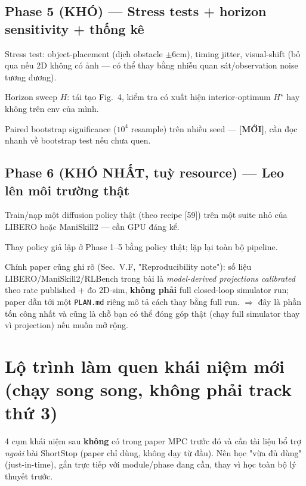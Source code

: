 \documentclass[a4paper,12pt]{article}
\let\stdsection\section
\renewcommand{\section}{\clearpage\stdsection}
\newcommand{\new}{\textcolor{red!60!black}{\textbf{[MỚI]}}}
\begin{document}
\subsection{Phase 5 (KHÓ) --- Stress tests + horizon sensitivity + thống kê}
\begin{tasklist}
  \item[\square] Stress test: object-placement (dịch obstacle $\pm6$cm), timing jitter, visual-shift (bỏ qua nếu 2D không có ảnh — có thể thay bằng nhiễu quan sát/observation noise tương đương).
  \item[\square] Horizon sweep $H$: tái tạo Fig.~4, kiểm tra có xuất hiện interior-optimum $H^\star$ hay không trên env của mình.
  \item[\square] Paired bootstrap significance ($10^4$ resample) trên nhiều seed — \new, cần đọc nhanh về bootstrap test nếu chưa quen.
\end{tasklist}

\subsection{Phase 6 (KHÓ NHẤT, tuỳ resource) --- Leo lên môi trường thật}
\begin{tasklist}
  \item[\square] Train/nạp một diffusion policy thật (theo recipe [59]) trên một suite nhỏ của LIBERO hoặc ManiSkill2 — cần GPU đáng kể.
  \item[\square] Thay policy giả lập ở Phase 1--5 bằng policy thật; lặp lại toàn bộ pipeline.
  \item[\textbf{Lưu ý quan trọng}] Chính paper cũng ghi rõ (Sec.~V.F, "Reproducibility note"): số liệu LIBERO/ManiSkill2/RLBench trong bài là \emph{model-derived projections calibrated} theo rate published + đo 2D-sim, \textbf{không phải} full closed-loop simulator run; paper dẫn tới một \texttt{PLAN.md} riêng mô tả cách thay bằng full run. $\Rightarrow$ đây là phần tốn công nhất và cũng là chỗ bạn có thể đóng góp thật (chạy full simulator thay vì projection) nếu muốn mở rộng.
\end{tasklist}

\section{Lộ trình làm quen khái niệm mới (chạy song song, không phải track thứ 3)}\label{sec:rampup}
4 cụm khái niệm sau \textbf{không} có trong paper MPC trước đó và cần tài liệu bổ trợ \emph{ngoài} bài ShortStop (paper chỉ dùng, không dạy từ đầu). Nên học "vừa đủ dùng" (just-in-time), gắn trực tiếp với module/phase đang cần, thay vì học toàn bộ lý thuyết trước.
\end{document}
